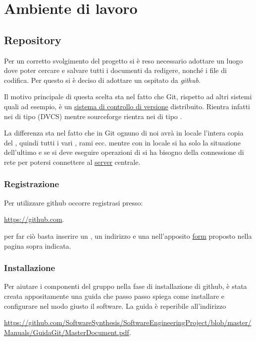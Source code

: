 \newpage
\section{Ambiente di lavoro}
\subsection{Repository}
\label{sec:repository}
Per un corretto svolgimento del progetto si è reso necessario adottare un luogo dove poter cercare e salvare tutti i documenti da redigere, nonché i file di codifica. Per questo si è deciso di adottare un \underline{} ospitato da \textit{github}.

Il motivo principale di questa scelta sta nel fatto che Git, rispetto ad altri sistemi quali  ad esempio, è un \underline{sistema di controllo di versione} distribuito. Rientra infatti nei  di tipo  (DVCS) mentre sourceforge rientra nei  di tipo .

La differenza sta nel fatto che in Git ognuno di noi avrà in locale l'intera copia del , quindi tutti i vari , rami ecc. mentre con  in locale si ha solo la situazione dell'ultimo  e se si deve eseguire operazioni di  si ha bisogno della connessione di rete per potersi connettere al \underline{server} centrale.

\subsubsection{Registrazione}
Per utilizzare github occorre registrasi presso:
\begin{center}
\url{https://github.com}.
\end{center}
per far ciò basta inserire un , un indirizzo  e una  nell'apposito \underline{form} proposto nella pagina sopra indicata.

\subsubsection{Installazione}
Per aiutare i componenti del gruppo nella fase di installazione di github, è stata creata appositamente una guida che passo passo spiega come installare e configurare nel modo giusto il software. La guida è reperibile all'indirizzo
\begin{center}
\url{https://github.com/SoftwareSynthesis/SoftwareEngineeringProject/blob/master/Manuals/GuidaGit/MasterDocument.pdf}.
\end{center}


